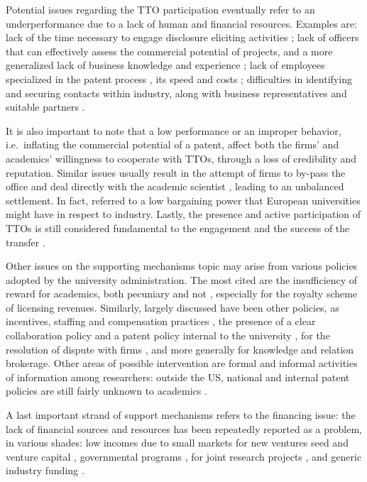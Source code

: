 Potential issues regarding the TTO participation eventually refer to an underperformance due to a lack of human and financial resources. Examples are: lack of the time necessary to engage disclosure eliciting activities \citep{Siegel2007}; lack of officers that can effectively assess the commercial potential of projects, and a more generalized lack of business knowledge and experience \citep{Hertzfeld2006}; lack of employees specialized in the patent process \citep{Baldini2007}, its speed and costs \citep{Fini2009}; difficulties in identifying and securing contacts within industry, along with business representatives \citep{Markman2005} and suitable partners \citep{Muscio2010}.

It is also important to note that a low performance or an improper behavior, i.e.\ inflating the commercial potential of a patent, affect both the firms' and academics' willingness to cooperate with TTOs, through a loss of credibility and reputation. Similar issues usually result in the attempt of firms to by-pass the office and deal directly with the academic scientist \citep{Link2007}, leading to an unbalanced settlement. In fact, \citet{Baldini2006} referred to a low bargaining power that European universities might have in respect to industry. Lastly, the presence and active participation of TTOs is still considered fundamental to the engagement and the success of the transfer \citep{Muscio2010}.

Other issues on the supporting mechanisms topic may arise from various policies adopted by the university administration. The most cited are the insufficiency of reward for academics, both pecuniary and not \citep{Siegel2007}, especially for the royalty scheme of licensing revenues. Similarly, largely discussed have been other policies, as incentives, staffing and compensation practices \citep{Baldini2007}, the presence of a clear collaboration policy and a patent policy internal to the university \citep{Muscio2008,Muscio2010,Muscio2013}, for the resolution of dispute with firms \citep{Belenzon2007}, and more generally for knowledge and relation brokerage. Other areas of possible intervention are formal and informal activities of information among researchers: outside the US, national and internal patent policies are still fairly unknown to academics \citep{Baldini2006}.

A last important strand of support mechanisms refers to the financing issue: the lack of financial sources and resources has been repeatedly reported as a problem, in various shades: low incomes due to small markets for new ventures \citep{Perez2003} seed and venture capital \citep{Rasmussen2006}, governmental programs \citep{Muscio2008}, for joint research projects \citep{Muscio2010}, and generic industry funding \citep{Muscio2013}.

